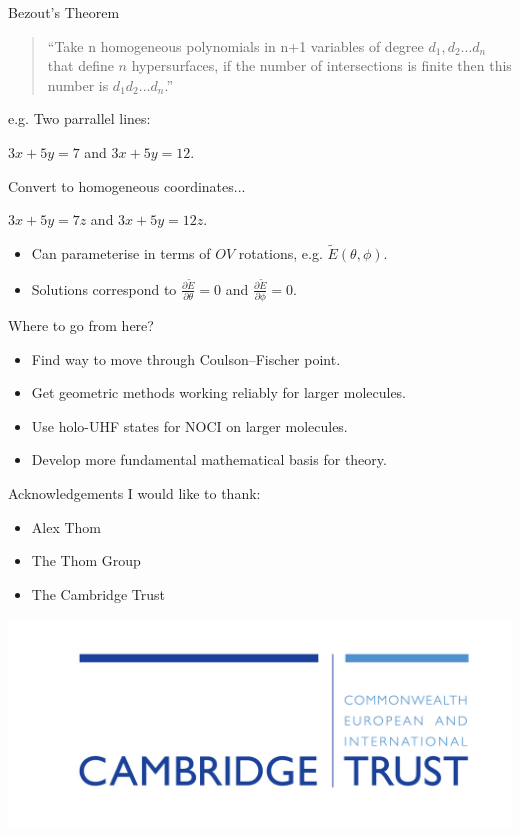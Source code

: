 \documentclass{beamer}
\def\hE{\tilde{E}}
\begin{document}
\begin{frame}{Bezout's Theorem}
\begin{quote}
``Take n homogeneous polynomials in n+1 variables of degree $d_1, d_2 ... d_n$ that define $n$ hypersurfaces, if the number of intersections is finite then this number is $d_1 d_2 ... d_n$.''
\end{quote}
e.g. Two parrallel lines:\\
\begin{center}
$3x + 5y = 7$ and $3x + 5y = 12$.
\end{center}
Convert to homogeneous coordinates...
\begin{center}
$3x + 5y = 7z$ and $3x + 5y = 12z$.
\end{center}
\begin{itemize}
\item Can parameterise in terms of $OV$ rotations, e.g. $\hE(\theta, \phi)$.
\item Solutions correspond to $\frac{\partial\tilde{E}}{\partial \theta} = 0$ and $\frac{\partial\tilde{E}}{\partial \phi} = 0$.
\end{itemize}
\end{frame}

\begin{frame}{Where to go from here?}
 \begin{itemize}
   \item{Find way to move through Coulson--Fischer point.}
   \item{Get geometric methods working \alert{reliably} for larger molecules.}
   \item{Use holo-UHF states for NOCI on larger molecules.}
   \item{Develop more fundamental mathematical basis for theory.}
 \end{itemize}
\end{frame}

\begin{frame}{Acknowledgements}
 I would like to thank:
 \begin{itemize}
  \item{Alex Thom}
  \item{The Thom Group}
  \item{The Cambridge Trust}
 \end{itemize}
 \begin{center}
  \includegraphics[scale=0.7]{template/CT_logo.jpg}
 \end{center}
\end{frame}
\end{document}
